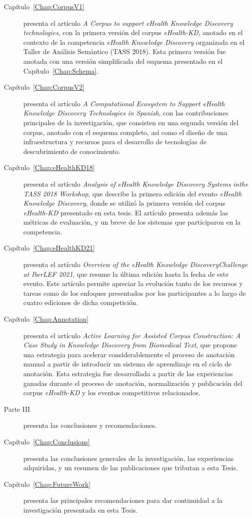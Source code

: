 \begin{description}
\item [Capítulo~\ref{Chap:CorpusV1}] presenta el artículo \textit{A Corpus to support eHealth Knowledge Discovery technologies}, con la primera versión del corpus \textit{eHealth-KD}, anotado en el contexto de la competencia \textit{eHealth Knowledge Discovery} organizada en el Taller de Análisis Semántico (TASS 2018). Esta primera versión fue anotada con una versión simplificada del esquema presentado en el Capítulo~\ref{Chap:Schema}.

\item [Capítulo~\ref{Chap:CorpusV2}] presenta el artículo \textit{A Computational Ecosystem to Support eHealth Knowledge Discovery Technologies in Spanish}, con las contribuciones principales de la investigación, que consisten en una segunda versión del corpus, anotado con el esquema completo, así como el diseño de una infraestructura y recursos para el desarrollo de tecnologías de descubrimiento de conocimiento.

\item [Capítulo~\ref{Chap:eHealthKD18}] presenta el artículo \textit{Analysis of eHealth Knowledge Discovery Systems inthe TASS 2018 Workshop}, que describe la primera edición del evento \textit{eHealth Knowledge Discovery}, donde se utilizó la primera versión del corpus \textit{eHealth-KD} presentado en esta tesis. El artículo presenta además las métricas de evaluación, y un breve de los sistemas que participaron en la competencia.

\item [Capítulo~\ref{Chap:eHealthKD21}] presenta el artículo \textit{Overview of the eHealth Knowledge DiscoveryChallenge at IberLEF 2021}, que resume la última edición hasta la fecha de este evento. Este artículo permite apreciar la evolución tanto de los recursos y tareas como de los enfoques presentados por los participantes a lo largo de cuatro ediciones de dicha competición.

\item [Capítulo~\ref{Chap:Annotation}] presenta el artículo \textit{Active Learning for Assisted Corpus Construction: A Case Study in Knowledge Discovery from Biomedical Text}, que propone una estrategia para acelerar considerablemente el proceso de anotación manual a partir de introducir un sistema de aprendizaje en el ciclo de anotación. Esta estrategia fue desarrollada a partir de las experiencias ganadas durante el proceso de anotación, normalización y publicación del corpus \textit{eHealth-KD} y los eventos competitivos relacionados.

\item[Parte III] presenta las conclusiones y recomendaciones.

\item [Capítulo~\ref{Chap:Conclusions}] presenta las conclusiones generales de la investigación, las experiencias adquiridas, y un resumen de las publicaciones que tributan a esta Tesis.

\item [Capítulo~\ref{Chap:FutureWork}] presenta las principales recomendaciones para dar continuidad a la investigación presentada en esta Tesis.

\end{description}
